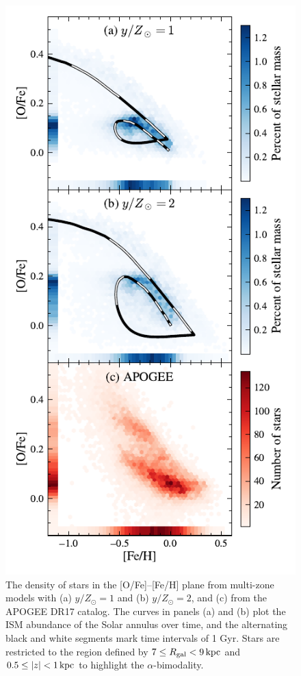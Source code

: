 \documentclass[twocolumn,twocolappendix,linenumbers]{aastex631}
\begin{document}
\begin{figure}
    \centering
    \includegraphics{figures/ofe_feh_density.pdf}
    \caption{The density of stars in the [O/Fe]--[Fe/H] plane from multi-zone models with (a) $y/Z_\odot=1$ and (b) $y/Z_\odot=2$, and (c) from the APOGEE DR17 catalog. The curves in panels (a) and (b) plot the ISM abundance of the Solar annulus over time, and the alternating black and white segments mark time intervals of {1 Gyr}. Stars are restricted to the region defined by $7\leq R_{\rm gal}< 9\,{\rm kpc}$ and $0.5\leq|z|<1\,{\rm kpc}$ to highlight the $\alpha$-bimodality.}
    \label{fig:ofe-feh-density}
\end{figure}
\end{document}
